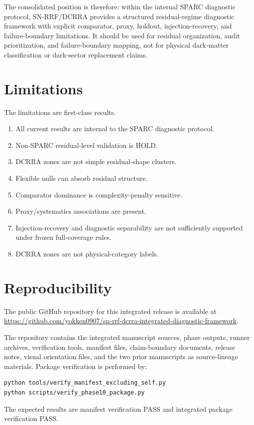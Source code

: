 \documentclass[11pt]{article}
\begin{document}
The consolidated position is therefore: within the internal SPARC diagnostic protocol, SN-RRF/DCRRA provides a structured residual-regime diagnostic framework with explicit comparator, proxy, holdout, injection-recovery, and failure-boundary limitations. It should be used for residual organization, audit prioritization, and failure-boundary mapping, not for physical dark-matter classification or dark-sector replacement claims.

\section{Limitations}
The limitations are first-class results.
\begin{enumerate}
\item All current results are internal to the SPARC diagnostic protocol.
\item Non-SPARC residual-level validation is HOLD.
\item DCRRA zones are not simple residual-shape clusters.
\item Flexible nulls can absorb residual structure.
\item Comparator dominance is complexity-penalty sensitive.
\item Proxy/systematics associations are present.
\item Injection-recovery and diagnostic separability are not sufficiently supported under frozen full-coverage rules.
\item DCRRA zones are not physical-category labels.
\end{enumerate}

\section{Reproducibility}
The public GitHub repository for this integrated release is available at \url{https://github.com/yokken0907/sn-rrf-dcrra-integrated-diagnostic-framework}.

The repository contains the integrated manuscript sources, phase outputs, runner archives, verification tools, manifest files, claim-boundary documents, release notes, visual orientation files, and the two prior manuscripts as source-lineage materials. Package verification is performed by:
\begin{verbatim}
python tools/verify_manifest_excluding_self.py
python scripts/verify_phase10_package.py
\end{verbatim}
The expected results are manifest verification PASS and integrated package verification PASS.
\end{document}
